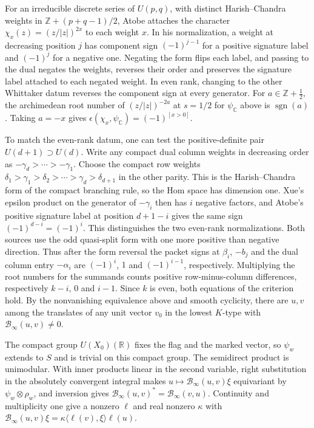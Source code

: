 For an irreducible discrete series of \(U(p,q)\), with distinct
Harish--Chandra weights in \(\mathbb Z+(p+q-1)/2\), Atobe attaches
the character \(\chi_x(z)=(z/|z|)^{2x}\) to each weight \(x\).
In his normalization, a weight at decreasing position \(j\) has
component sign \((-1)^{j-1}\) for a positive signature label and
\((-1)^j\) for a negative one. Negating the form flips each label,
and passing to the dual negates the weights, reverses their order
and preserves the signature label attached to each negated weight.
In even rank, changing to the other Whittaker datum reverses the
component sign at every generator.
\cite[\S2.2, Theorem~2.1(4),(6),(7) and Theorem~A.4]{p2atobe-hc}
For \(a\in\mathbb Z+\tfrac12\), the archimedean root number of
\((z/|z|)^{-2a}\) at \(s=1/2\) for \(\psi_{\mathbb C}\) above is
\(\operatorname{sgn}(a)\). Taking \(a=-x\) gives
\(\epsilon(\chi_x,\psi_{\mathbb C})=(-1)^{[x>0]}\).
\cite[Proposition~2.1]{p2ggp-examples}

To match the even-rank datum, one can test the positive-definite
pair \(U(d+1)\supset U(d)\). Write any compact dual column weights
in decreasing order as \(-\gamma_d>\cdots>-\gamma_1\). Choose the
compact row weights \(\delta_1>\gamma_1>\delta_2>\cdots>
\gamma_d>\delta_{d+1}\) in the other parity. This is the
Harish--Chandra form of the compact branching rule, so the Hom space
has dimension one. Xue's epsilon product on the generator of
\(-\gamma_i\) then has \(i\) negative factors, and Atobe's positive
signature label at position \(d+1-i\) gives the same sign
\((-1)^{d-i}=(-1)^i\). This distinguishes the two even-rank
normalizations. Both sources use the odd quasi-split form with one
more positive than negative direction.
\cite[Introduction and Theorem~1.1]{p2xue-bessel}
\cite[Appendix~A.3--A.4]{p2atobe-hc}
Thus after the form reversal the packet signs at \(\beta_i\),
\(-b_j\) and the dual column entry \(-\alpha_i\) are
\((-1)^i\), \(1\) and \((-1)^{i-1}\), respectively. Multiplying
the root numbers for the summands counts positive row-minus-column
differences, respectively \(k-i\), \(0\) and \(i-1\). Since \(k\)
is even, both equations of the criterion hold.
By the nonvanishing equivalence above and smooth cyclicity, there
are \(u,v\) among the translates of any unit vector \(v_0\) in the
lowest \(K\)-type with \(\mathcal B_\infty(u,v)\ne0\).

The compact group \(U(X_0)(\mathbb R)\) fixes the flag and the marked
vector, so \(\psi_w\) extends to \(S\) and is trivial on this compact
group. The semidirect product is unimodular. With inner products linear
in the second variable, right substitution in the absolutely convergent
integral makes \(u\mapsto\mathcal B_\infty(u,v)\xi\) equivariant by
\(\psi_w\otimes\rho_w\), and inversion gives
\(\mathcal B_\infty(u,v)^*=\mathcal B_\infty(v,u)\). Continuity and
multiplicity one give a nonzero \(\ell\) and real nonzero \(\kappa\) with
\(\mathcal B_\infty(u,v)\xi=\kappa\langle\ell(v),\xi\rangle\ell(u)\).

